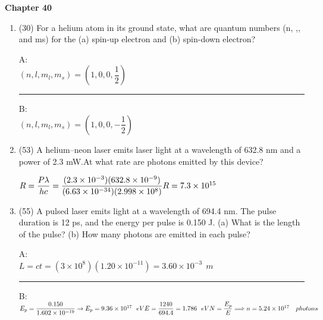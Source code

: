 \documentclass[fleqn]{article}
\begin{document}
  \textbf{Chapter 40}
  \begin{enumerate}
    \item (30) For a helium atom in its ground state, what are quantum numbers (n, ,, and ms) for the (a) spin-up electron and
    (b) spin-down electron?

    \textcolor{hwColor}{
      A: \\
      $
        (n,l,m_l,m_s)=(1,0,0,\dfrac{1}{2})
      $ 
    }

    \textcolor{hwColor}{ 
      \rule{16cm}{0.6pt} 
    }

    \textcolor{hwColor}{
      B: \\
      $
        (n,l,m_l,m_s)=(1,0,0,-\dfrac{1}{2})
      $ 
    }


    \item (53) A helium–neon laser emits laser light at a wavelength of
    632.8 nm and a power of 2.3 mW.At what rate are photons emitted
    by this device?

    \textcolor{hwColor}{
      $
        R=\dfrac{P \lambda}{hc}=\dfrac{(2.3 \times 10^{-3})(632.8 \times 10^{-9})}{(6.63 \times 10^{-34})(2.998 \times 10^8)} \\
        \\
        R=7.3 \times 10^{15}
      $ 
    }
    
    
    \item (55) A pulsed laser emits light at a wavelength of 694.4 nm. The
    pulse duration is 12 ps, and the energy per pulse is 0.150 J. (a) What
    is the length of the pulse? (b) How many photons are emitted in
    each pulse?

    \textcolor{hwColor}{
      A: \\
      $
        L=ct=(3 \times 10^8)(1.20 \times 10^{-11})=3.60 \times 10^{-3} ~~ m
      $ 
    }

    \textcolor{hwColor}{ 
      \rule{16cm}{0.6pt} 
    }

    \textcolor{hwColor}{
      B: \\
      $
        E_p=\dfrac{0.150}{1.602 \times 10^{-19}} \rightarrow E_p=9.36 \times 10^{17} ~~ eV \\
        \\
        E=\dfrac{1240}{694.4}=1.786 ~~ eV \\
        \\
        N=\dfrac{E_p}{E} \Longrightarrow n=5.24 \times 10^{17} ~~~ photons
      $ 
    }

  \end{enumerate}
\end{document}
